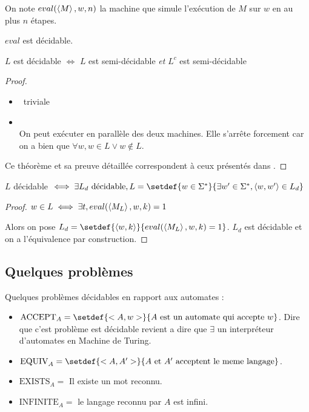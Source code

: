 \begin{definition}[eval]
	On note $eval(\left\langle M\right\rangle, w, n)$ la machine que simule l'exécution de $M$ sur $w$ en au plus $n$ étapes.
\end{definition}

\begin{prop}[Admis]
	$eval$ est décidable.
\end{prop}

\begin{prop}
	$L$ est décidable $\iff$ $L$ est semi-décidable \emph{et} $L^c$ est semi-décidable
\end{prop}

\begin{proof}
	\begin{itemize}
		\item \bimpLR \ triviale
		\item \bimpRL \\
		      On peut exécuter en parallèle des deux machines. Elle s'arrête forcement car on a bien que $\forall w, w \in L \lor w \notin L$.
	\end{itemize}
	Ce théorème et sa preuve détaillée correspondent à ceux présentés dans \cite[Theorem~4.22]{sipser}.
\end{proof}


\begin{prop}
	$L$ décidable $\iff \exists L_d \text{ décidable}, L = \setdef {w \in \mots} {\exists w' \in \mots, \encode{w,w'} \in L_d}$
\end{prop}


\begin{proof}
	$w \in L \iff \exists t, eval(\left\langle M_L\right\rangle, w, k) = 1$

	Alors on pose $L_d = \setdef {\encode{w, k}} {eval(\encode {M_L}, w,k) = 1}$.
	$L_d$ est décidable et on a l'équivalence par construction.
\end{proof}


\subsection{Quelques problèmes}

Quelques problèmes décidables en rapport aux automates :

\begin{itemize}
	\item $\text{ACCEPT}_A = \setdef {<A,w>} {A \text { est un automate qui accepte } w}$.
	      Dire que c'est problème est décidable revient a dire que $\exists$ un interpréteur d'automates en Machine de Turing.
	\item $\text{EQUIV}_A = \setdef {<A,A'>} {A \text { et } A' \text{ acceptent le meme langage}}$.
	\item $\text{EXISTS}_A = $ Il existe un mot reconnu.
	\item $\text{INFINITE}_A = $ le langage reconnu par $A$ est infini.
\end{itemize}


